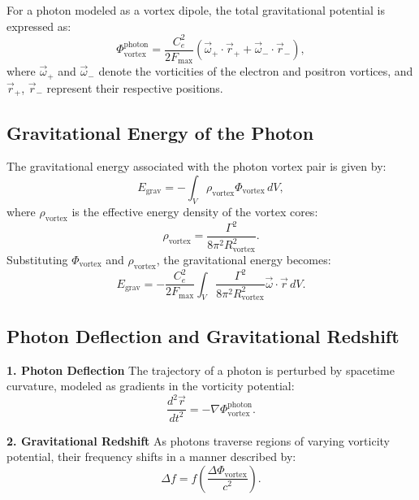 \documentclass[a4paper,10pt]{article}
\begin{document}
    For a photon modeled as a vortex dipole, the total gravitational potential is expressed as:
    \begin{equation*}
        \Phi_\text{vortex}^\text{photon} = \frac{C_e^2}{2 F_{\max}} \left( \vec{\omega}_+ \cdot \vec{r}_+ + \vec{\omega}_- \cdot \vec{r}_- \right),
    \end{equation*}
    where $\vec{\omega}_+$ and $\vec{\omega}_-$ denote the vorticities of the electron and positron vortices, and $\vec{r}_+$, $\vec{r}_-$ represent their respective positions.

    \subsection*{Gravitational Energy of the Photon}
    The gravitational energy associated with the photon vortex pair is given by:
    \begin{equation*}
        E_\text{grav} = -\int_V \rho_\text{vortex} \Phi_\text{vortex} \, dV,
    \end{equation*}
    where $\rho_\text{vortex}$ is the effective energy density of the vortex cores:
    \begin{equation*}
        \rho_\text{vortex} = \frac{\Gamma^2}{8 \pi^2 R_\text{vortex}^2}.
    \end{equation*}
    Substituting $\Phi_\text{vortex}$ and $\rho_\text{vortex}$, the gravitational energy becomes:
    \begin{equation*}
        E_\text{grav} = -\frac{C_e^2}{2 F_{\max}} \int_V \frac{\Gamma^2}{8 \pi^2 R_\text{vortex}^2} \vec{\omega} \cdot \vec{r} \, dV.
    \end{equation*}

    \subsection*{Photon Deflection and Gravitational Redshift}
    \textbf{1. Photon Deflection}
    The trajectory of a photon is perturbed by spacetime curvature, modeled as gradients in the vorticity potential:
    \begin{equation*}
        \frac{d^2 \vec{r}}{dt^2} = -\nabla \Phi_\text{vortex}^\text{photon}.
    \end{equation*}

    \textbf{2. Gravitational Redshift}
    As photons traverse regions of varying vorticity potential, their frequency shifts in a manner described by:
    \begin{equation*}
        \Delta f = f \left( \frac{\Delta \Phi_\text{vortex}}{c^2} \right).
    \end{equation*}
\end{document}
